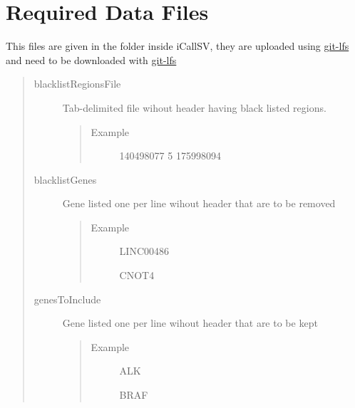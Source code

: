 \documentclass[letterpaper,10pt,english]{sphinxmanual}
\begin{document}
\section{Required Data Files}
\label{iCallSV:required-data-files}
This files are given in the  folder inside iCallSV, they are uploaded using \href{https://git-lfs.github.com/}{git-lfs} and need to be downloaded with \href{https://git-lfs.github.com/}{git-lfs}
\begin{quote}\begin{description}
\item[{blacklistRegionsFile}] \leavevmode
Tab-delimited file wihout header having black listed regions.
\begin{quote}\begin{description}
\item[{Example}]        140498077       5       175998094

\end{description}\end{quote}

\item[{blacklistGenes}] \leavevmode
Gene listed one per line wihout header that are to be removed
\begin{quote}\begin{description}
\item[{Example}] \leavevmode
LINC00486

CNOT4

\end{description}\end{quote}

\item[{genesToInclude}] \leavevmode
Gene listed one per line wihout header that are to be kept
\begin{quote}\begin{description}
\item[{Example}] \leavevmode
ALK

BRAF

\end{description}\end{quote}

\end{description}\end{quote}
\end{document}
